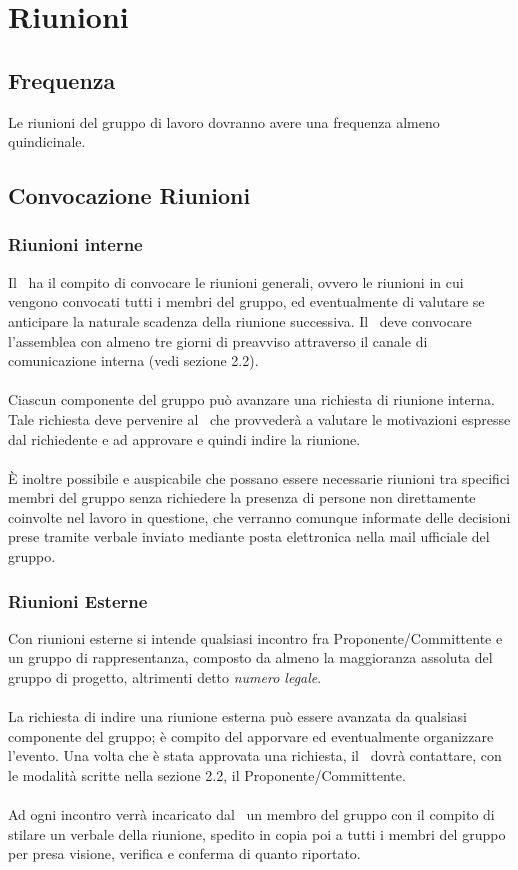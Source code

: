 \section{Riunioni}
\subsection{Frequenza}
Le riunioni del gruppo di lavoro dovranno avere una frequenza almeno quindicinale.
\subsection{Convocazione Riunioni}
\subsubsection{Riunioni interne}
Il \ruoloResponsabile\ ha il compito di convocare le riunioni generali, ovvero le riunioni in cui vengono convocati tutti i membri del gruppo, ed eventualmente di valutare se anticipare la naturale scadenza della riunione successiva. Il \ruoloResponsabile\ deve convocare l’assemblea con almeno tre giorni di preavviso attraverso il canale di comunicazione interna (vedi sezione 2.2). \\ \\
Ciascun componente del gruppo può avanzare una richiesta di riunione interna.
Tale richiesta deve pervenire al \ruoloResponsabile\ che provvederà a valutare le motivazioni espresse dal richiedente e ad approvare e quindi indire la riunione. \\ \\
È inoltre possibile e auspicabile che possano essere necessarie riunioni tra specifici membri del gruppo senza richiedere la presenza di persone non direttamente coinvolte nel lavoro in questione, che verranno comunque informate delle decisioni prese tramite verbale inviato mediante posta elettronica nella mail ufficiale del gruppo.

\subsubsection{Riunioni Esterne}
Con riunioni esterne si intende qualsiasi incontro fra Proponente/Committente
e un gruppo di rappresentanza, composto da almeno la maggioranza assoluta del
gruppo di progetto, altrimenti detto \textit{numero legale}.\\
\\
La richiesta di indire una riunione esterna può essere avanzata da qualsiasi componente del gruppo; è compito del \ruoloResponsabile apporvare ed eventualmente organizzare l'evento. Una volta che è stata approvata una richiesta, il \ruoloResponsabile\ dovrà contattare, con le modalità scritte nella sezione 2.2, il Proponente/Committente.
\\\\
Ad ogni incontro verrà incaricato dal \ruoloResponsabile\ un membro del gruppo con il compito di stilare un verbale della riunione, spedito in copia poi a tutti i membri del gruppo per presa visione, verifica e conferma di quanto riportato.